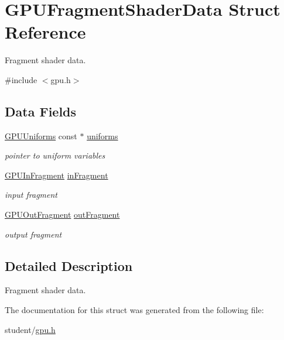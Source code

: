 \hypertarget{structGPUFragmentShaderData}{}\section{G\+P\+U\+Fragment\+Shader\+Data Struct Reference}
\label{structGPUFragmentShaderData}


Fragment shader data.  




{\ttfamily \#include $<$gpu.\+h$>$}

\subsection*{Data Fields}
\begin{DoxyCompactItemize}
\item 
\mbox{\label{structGPUFragmentShaderData_ad8271d982c7c798d1f617d9235a8bbf8}} 
\hyperlink{structGPUUniforms}{G\+P\+U\+Uniforms} const  $\ast$ \hyperlink{structGPUFragmentShaderData_ad8271d982c7c798d1f617d9235a8bbf8}{uniforms}
\begin{DoxyCompactList}\small\item\em pointer to uniform variables \end{DoxyCompactList}\item 
\mbox{\label{structGPUFragmentShaderData_aa286b4180c0efb8593bbe0ecb8c6e60a}} 
\hyperlink{structGPUInFragment}{G\+P\+U\+In\+Fragment} \hyperlink{structGPUFragmentShaderData_aa286b4180c0efb8593bbe0ecb8c6e60a}{in\+Fragment}
\begin{DoxyCompactList}\small\item\em input fragment \end{DoxyCompactList}\item 
\mbox{\label{structGPUFragmentShaderData_a28b76dc4f0e9b7ee82e744660106848a}} 
\hyperlink{structGPUOutFragment}{G\+P\+U\+Out\+Fragment} \hyperlink{structGPUFragmentShaderData_a28b76dc4f0e9b7ee82e744660106848a}{out\+Fragment}
\begin{DoxyCompactList}\small\item\em output fragment \end{DoxyCompactList}\end{DoxyCompactItemize}


\subsection{Detailed Description}
Fragment shader data. 

The documentation for this struct was generated from the following file\+:\begin{DoxyCompactItemize}
\item 
student/\hyperlink{gpu_8h}{gpu.\+h}\end{DoxyCompactItemize}
